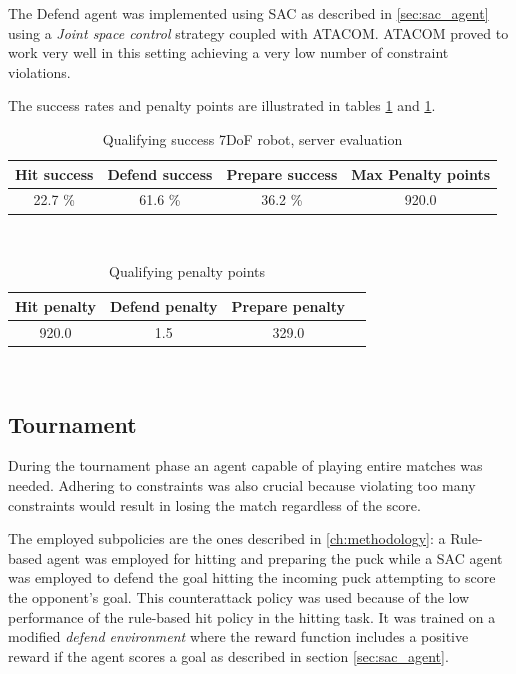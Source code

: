 The Defend agent was implemented using SAC as described in \ref{sec:sac_agent} using a \textit{Joint space control} strategy coupled with ATACOM. ATACOM proved
to work very well in this setting achieving a very low number of constraint violations.

The success rates and penalty points are illustrated in tables \ref{table:qualifying_success} and \ref{table:qualifying_success}.

\begin{table}[H]
    \centering 
    \begin{tabular}{|c | c | c | c |}
    \hline
     \textbf{Hit success} & \textbf{Defend success} & \textbf{Prepare success} & \textbf{Max Penalty points} \T\B \\
    \hline \hline
    22.7 \% & 61.6 \% & 36.2 \% & 920.0 \T\B \\
    \hline
    \end{tabular}
    \\[10pt]
    \caption{Qualifying success 7DoF robot, server evaluation}
    \label{table:qualifying_success}
\end{table}

\begin{table}[H]
    \centering 
    \begin{tabular}{|c | c | c | c |}
    \hline
     \textbf{Hit penalty} & \textbf{Defend penalty} & \textbf{Prepare penalty} \T\B \\
    \hline \hline
    920.0 & 1.5 & 329.0 \T\B \\
    \hline
    \end{tabular}
    \\[10pt]
    \caption{Qualifying penalty points}
    \label{table:qualifying_penalties}
\end{table}

\subsection{Tournament}
During the tournament phase an agent capable of playing entire matches was needed.
Adhering to constraints was also crucial because violating too many constraints would result in losing the match regardless of the score.

The employed subpolicies are the ones described in \ref{ch:methodology}: a Rule-based agent was employed for hitting and preparing the puck while
a SAC agent was employed to defend the goal hitting the incoming puck attempting to score the opponent's goal. This counterattack policy was used
because of the low performance of the rule-based hit policy in the hitting task. It was trained on a modified \textit{defend environment} where the reward function
includes a positive reward if the agent scores a goal as described in section \ref{sec:sac_agent}.

